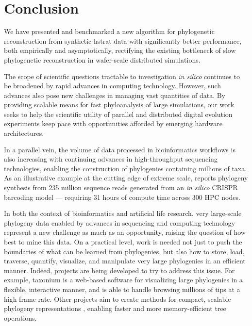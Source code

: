 \section{Conclusion} \label{sec:conclusion}

We have presented and benchmarked a new algorithm for phylogenetic reconstruction from synthetic hstrat \citep{moreno2024hstrat} data with significantly better performance, both empirically and asymptotically, rectifying the existing bottleneck of slow phylogenetic reconstruction in wafer-scale distributed simulations.

The scope of scientific questions tractable to investigation \textit{in silico} continues to be broadened by rapid advances in computing technology.
However, such advances also pose new challenges in managing vast quantities of data.
By providing scalable means for fast phyloanalysis of large simulations, our work seeks to help the scientific utility of parallel and distributed digital evolution experiments keep pace with opportunities afforded by emerging hardware architectures.

In a parallel vein, the volume of data processed in bioinformatics workflows is also increasing with continuing advances in high-throughput sequencing technologies, enabling the construction of phylogenies containing millions of taxa.
As an illustrative example at the cutting edge of extreme scale, \citet{konno2022deep} reports phylogeny synthesis from 235 million sequence reads generated from an \textit{in silico} CRISPR barcoding model --- requiring 31 hours of compute time across 300 HPC nodes.

In both the context of bioinformatics and artificial life research, very large-scale phylogeny data enabled by advances in sequencing and computing technology represent a new challenge as much as an opportunity, raising the question of how best to mine this data.
On a practical level, work is needed not just to push the boundaries of what can be learned from phylogenies, but also how to store, load, traverse, quantify, visualize, and manipulate very large phylogenies in an efficient manner.
Indeed, projects are being developed to try to address this issue.
For example, taxonium \citep{sanderson2022taxonium} is a web-based software for visualizing large phylogenies in a flexible, interactive manner, and is able to handle browsing millions of tips at a high frame rate.
Other projects aim to create methods for compact, scalable phylogeny representations \citep{moshiri2025compacttree, moshiri2020treeswift}, enabling faster and more memory-efficient tree operations.

